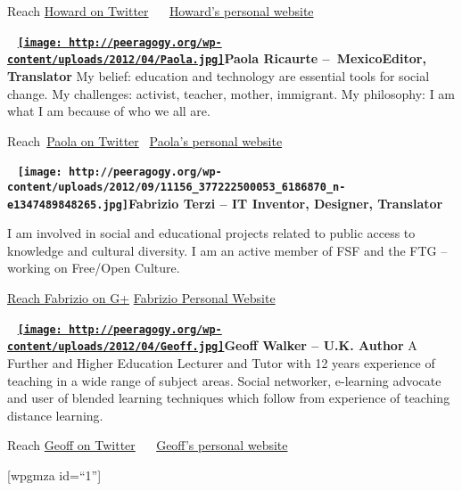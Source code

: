 Reach \href{https://twitter.com/\#!/hrheingold}{Howard on Twitter}
~\textbar{} ~\href{http://www.rheingold.com}{Howard's personal website}

~
\textbf{\href{http://peeragogy.org/wp-content/uploads/2012/04/Paola.jpg}{\texttt{[image: http://peeragogy.org/wp-content/uploads/2012/04/Paola.jpg]}}Paola
Ricaurte --~Mexico}\textbf{Editor, Translator} My belief: education and
technology are essential tools for social change. My challenges:
activist, teacher, mother, immigrant. My philosophy: I am what I am
because of who we all are.

Reach~\href{https://twitter.com/paolaricaurte}{Paola on Twitter}
\textbar{} ~\href{http://blogs.eluniversal.com.mx/virtualis/}{Paola's
personal website}

~
\textbf{\texttt{[image: http://peeragogy.org/wp-content/uploads/2012/09/11156\_377222500053\_6186870\_n-e1347489848265.jpg]}Fabrizio
Terzi -- IT Inventor, Designer, Translator}

I am involved in social and educational projects related to public
access to knowledge and cultural diversity. I am an active member of FSF
and the FTG -- working on Free/Open Culture.

\href{https://plus.google.com/u/0/+FabrizioTerzi/about}{Reach Fabrizio
on G+} \textbar{} \href{http://metameso.org/~fabrizio/}{Fabrizio
Personal Website}

~
\textbf{\href{http://peeragogy.org/wp-content/uploads/2012/04/Geoff.jpg}{\texttt{[image: http://peeragogy.org/wp-content/uploads/2012/04/Geoff.jpg]}}Geoff
Walker -- U.K. Author} A Further and Higher Education Lecturer and Tutor
with 12 years experience of teaching in a wide range of subject areas.
Social networker, e-learning advocate and user of blended learning
techniques which follow from experience of teaching distance learning.

Reach \href{https://twitter.com/\#!/geoffreyawalker}{Geoff on Twitter}
~\textbar{} ~\href{http://geoffreyawalker.blog.co.uk}{Geoff's personal
website}

{[}wpgmza id=``1''{]}
